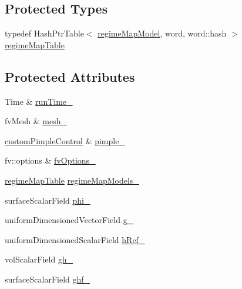 \subsection*{Protected Types}
\begin{DoxyCompactItemize}
\item 
typedef Hash\+Ptr\+Table$<$ \hyperlink{classFoam_1_1regimeMapModel}{regime\+Map\+Model}, word, word\+::hash $>$ \hyperlink{classFoam_1_1thermalHydraulicsModel_a988a92d1e4c95a1031e163a28d4d4d39}{regime\+Map\+Table}
\end{DoxyCompactItemize}
\subsection*{Protected Attributes}
\begin{DoxyCompactItemize}
\item 
Time \& \hyperlink{classFoam_1_1thermalHydraulicsModel_a4659eb289beeeef5f54215ac0ea1940e}{run\+Time\+\_\+}
\item 
fv\+Mesh \& \hyperlink{classFoam_1_1thermalHydraulicsModel_ad11fd245eb0e1a8279a432baf8530212}{mesh\+\_\+}
\item 
\hyperlink{classFoam_1_1customPimpleControl}{custom\+Pimple\+Control} \& \hyperlink{classFoam_1_1thermalHydraulicsModel_a2584cdde1129602da3e610a7a3f9956a}{pimple\+\_\+}
\item 
fv\+::options \& \hyperlink{classFoam_1_1thermalHydraulicsModel_a0f6be1c062fbc4a4b5975f813869c25e}{fv\+Options\+\_\+}
\item 
\hyperlink{classFoam_1_1thermalHydraulicsModel_a988a92d1e4c95a1031e163a28d4d4d39}{regime\+Map\+Table} \hyperlink{classFoam_1_1thermalHydraulicsModel_af51a395bb3206c131039177529923215}{regime\+Map\+Models\+\_\+}
\item 
surface\+Scalar\+Field \hyperlink{classFoam_1_1thermalHydraulicsModel_a9ef11e1d0a5d5fdcc8773a0119046fe4}{phi\+\_\+}
\item 
uniform\+Dimensioned\+Vector\+Field \hyperlink{classFoam_1_1thermalHydraulicsModel_a5f75aabd8084438c9ff0b9cafdcfa158}{g\+\_\+}
\item 
uniform\+Dimensioned\+Scalar\+Field \hyperlink{classFoam_1_1thermalHydraulicsModel_accb961b851689bd8f81f9c66b7a28ad7}{h\+Ref\+\_\+}
\item 
vol\+Scalar\+Field \hyperlink{classFoam_1_1thermalHydraulicsModel_a56280c68c4b8b8f9941aec2adf286c18}{gh\+\_\+}
\item 
surface\+Scalar\+Field \hyperlink{classFoam_1_1thermalHydraulicsModel_ace92137e0e195405c8796327143c8c24}{ghf\+\_\+}

\end{DoxyCompactItemize}
